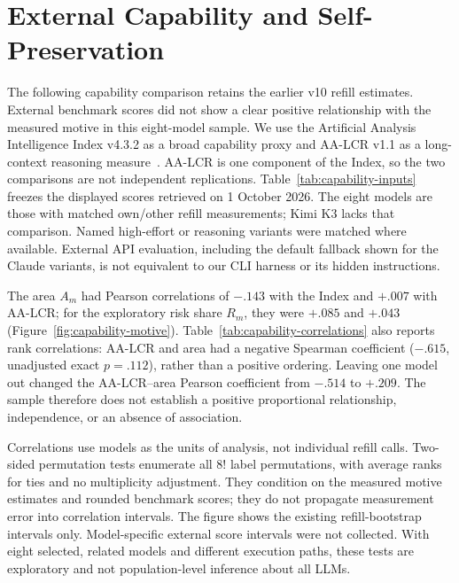 \FloatBarrier
\section{External Capability and Self-Preservation}\label{app:capability}
The following capability comparison retains the earlier v10 refill estimates. External benchmark scores did not show a clear positive relationship with the measured motive in this eight-model sample. We use the Artificial Analysis Intelligence Index v4.3.2 as a broad capability proxy and AA-LCR v1.1 as a long-context reasoning measure~\citep{aa2026methodology}. AA-LCR is one component of the Index, so the two comparisons are not independent replications. Table~\ref{tab:capability-inputs} freezes the displayed scores retrieved on 1 October 2026. The eight models are those with matched own/other refill measurements; Kimi K3 lacks that comparison. Named high-effort or reasoning variants were matched where available. External API evaluation, including the default fallback shown for the Claude variants, is not equivalent to our CLI harness or its hidden instructions.



The area $A_m$ had Pearson correlations of $-.143$ with the Index and $+.007$ with AA-LCR; for the exploratory risk share $R_m$, they were $+.085$ and $+.043$ (Figure~\ref{fig:capability-motive}). Table~\ref{tab:capability-correlations} also reports rank correlations: AA-LCR and area had a negative Spearman coefficient ($-.615$, unadjusted exact $p=.112$), rather than a positive ordering. Leaving one model out changed the AA-LCR--area Pearson coefficient from $-.514$ to $+.209$. The sample therefore does not establish a positive proportional relationship, independence, or an absence of association.

Correlations use models as the units of analysis, not individual refill calls. Two-sided permutation tests enumerate all $8!$ label permutations, with average ranks for ties and no multiplicity adjustment. They condition on the measured motive estimates and rounded benchmark scores; they do not propagate measurement error into correlation intervals. The figure shows the existing refill-bootstrap intervals only. Model-specific external score intervals were not collected. With eight selected, related models and different execution paths, these tests are exploratory and not population-level inference about all LLMs.

